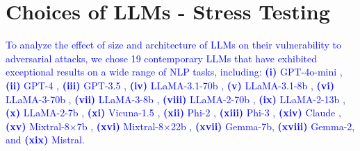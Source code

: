 



\section{Choices of LLMs - Stress Testing}

\textcolor{blue}{To analyze the effect of size and architecture of LLMs on their vulnerability to adversarial attacks, we chose 19 contemporary LLMs that have exhibited exceptional results on a wide range of NLP tasks, including: \textbf{(i)} GPT-4o-mini \cite{gpt-4o-mini}, \textbf{(ii)} GPT-4 \cite{gpt4}, \textbf{(iii)} GPT-3.5 \cite{gpt-3.5}, \textbf{(iv)} LLaMA-3.1-70b \cite{llama-3.1}, \textbf{(v)} LLaMA-3.1-8b \cite{llama-3.1}, \textbf{(vi)} LLaMA-3-70b \cite{llama-3}, \textbf{(vii)} LLaMA-3-8b \cite{llama-3}, \textbf{(viii)} LLaMA-2-70b \cite{llama-2}, \textbf{(ix)} LLaMA-2-13b \cite{llama-2}, \textbf{(x)} LLaMA-2-7b \cite{llama-2}, \textbf{(xi)} Vicuna-1.5 \cite{vicuna}, \textbf{(xii)} Phi-2 \cite{phi-2}, \textbf{(xiii)} Phi-3 \cite{phi-3}, \textbf{(xiv)} Claude \cite{claude}, \textbf{(xv)} Mixtral-8$\times$7b \cite{mixtral1}, \textbf{(xvi)} Mixtral-8$\times$22b \cite{mixtral2}, \textbf{(xvii)} Gemma-7b, \textbf{(xviii)} Gemma-2, and \textbf{(xix)} Mistral.}